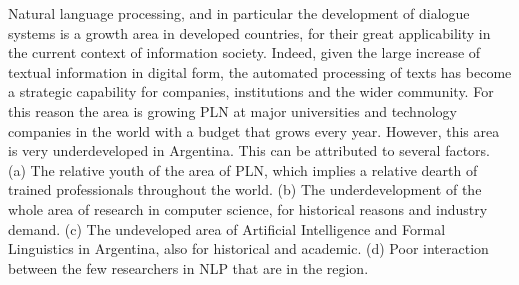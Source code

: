


Natural language processing, and in particular the development of dialogue
systems is a growth area in developed countries, for their great applicability
in the current context of information society. Indeed, given the large increase
of textual information in digital form, the automated processing of texts has
become a strategic capability for companies, institutions and the wider
community. For this reason the area is growing PLN at major universities and
technology companies in the world with a budget that grows every year. However,
this area is very underdeveloped in Argentina. This can be attributed to several
factors. (a) The relative youth of the area of PLN, which implies a relative
dearth of trained professionals throughout the world. (b) The underdevelopment
of the whole area of research in computer science, for historical reasons and
industry demand. (c) The undeveloped area of Artificial Intelligence and
Formal Linguistics in Argentina, also for historical and academic. (d) Poor
interaction between the few researchers in NLP that are in the region. 

